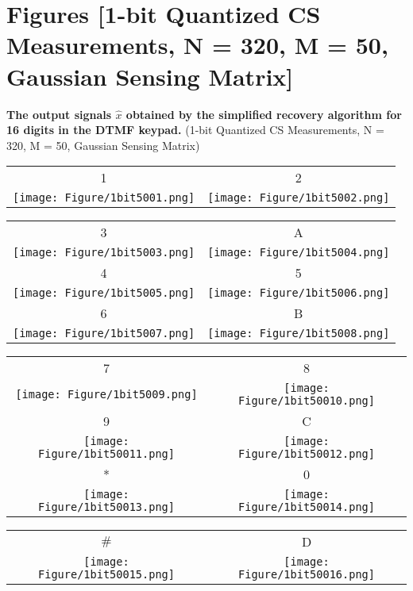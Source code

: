\chapter{Figures [1-bit Quantized CS Measurements, N = 320, M = 50, Gaussian Sensing Matrix]} \label{C}


\textbf{The output signals $\hat{x}$ obtained by the simplified recovery algorithm for 16 digits in the DTMF keypad.}
(1-bit Quantized CS Measurements, N = 320, M = 50, Gaussian Sensing Matrix)

\begin{table}[h]
\begin{tabular}{cc}
1 & 2 \\
\texttt{[image: Figure/1bit5001.png]} &
\texttt{[image: Figure/1bit5002.png]} \\
\end{tabular}
\end{table}

\begin{table}[h]
\begin{tabular}{cc}
3 & A \\
\texttt{[image: Figure/1bit5003.png]} &
\texttt{[image: Figure/1bit5004.png]} \\
4 & 5 \\
\texttt{[image: Figure/1bit5005.png]} &
\texttt{[image: Figure/1bit5006.png]} \\
6 & B \\
\texttt{[image: Figure/1bit5007.png]} &
\texttt{[image: Figure/1bit5008.png]} \\
\end{tabular}
\end{table}

\begin{table}[h]
\begin{tabular}{cc}
7 & 8 \\
\texttt{[image: Figure/1bit5009.png]} &
\texttt{[image: Figure/1bit50010.png]} \\
9 & C \\
\texttt{[image: Figure/1bit50011.png]} &
\texttt{[image: Figure/1bit50012.png]} \\
* & 0 \\
\texttt{[image: Figure/1bit50013.png]} &
\texttt{[image: Figure/1bit50014.png]} \\
\end{tabular}
\end{table}

\begin{table}[h]
\begin{tabular}{cc}
$\#$ & D \\
\texttt{[image: Figure/1bit50015.png]} &
\texttt{[image: Figure/1bit50016.png]} \\
\end{tabular}
\end{table}